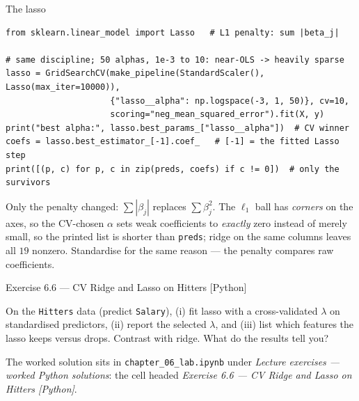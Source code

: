 \documentclass[aspectratio=169,11pt]{beamer}
\begin{document}
\begin{frame}[fragile]{The lasso}
  \begin{lstlisting}
from sklearn.linear_model import Lasso   # L1 penalty: sum |beta_j|

# same discipline; 50 alphas, 1e-3 to 10: near-OLS -> heavily sparse
lasso = GridSearchCV(make_pipeline(StandardScaler(), Lasso(max_iter=10000)),
                     {"lasso__alpha": np.logspace(-3, 1, 50)}, cv=10,
                     scoring="neg_mean_squared_error").fit(X, y)
print("best alpha:", lasso.best_params_["lasso__alpha"])  # CV winner
coefs = lasso.best_estimator_[-1].coef_   # [-1] = the fitted Lasso step
print([(p, c) for p, c in zip(preds, coefs) if c != 0])  # only the survivors
  \end{lstlisting}
  \begin{readme}
    Only the penalty changed: $\sum|\beta_j|$ replaces $\sum\beta_j^2$.
    The $\ell_1$ ball has \emph{corners} on the axes, so the CV-chosen
    $\alpha$ sets weak coefficients to \emph{exactly} zero instead of
    merely small, so the printed list is shorter than \texttt{preds};
    ridge on the same columns leaves all $19$ nonzero. Standardise for
    the same reason --- the penalty compares raw coefficients.
  \end{readme}
\end{frame}

\begin{frame}[fragile]{Exercise 6.6 --- CV Ridge and Lasso on Hitters [Python]}
  \begin{exercise}
    On the \texttt{Hitters} data (predict \texttt{Salary}), (i) fit
    lasso with a cross-validated $\lambda$ on standardised predictors,
    (ii) report the selected $\lambda$, and (iii) list which features the
    lasso keeps versus drops. Contrast with ridge. What do the results
    tell you?
  \end{exercise}
  \begin{labnote}
    The worked solution sits in \texttt{chapter\_06\_lab.ipynb} under
    \emph{Lecture exercises --- worked Python solutions}: the cell headed
    \emph{Exercise 6.6 --- CV Ridge and Lasso on Hitters [Python]}.
  \end{labnote}
\end{frame}
\end{document}
